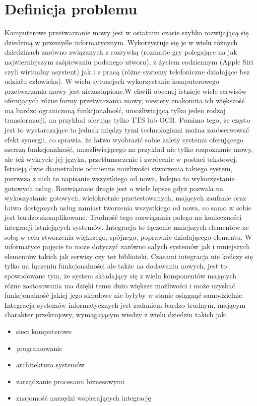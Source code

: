 \section{Definicja problemu} %
Komputerowe przetwarzanie mowy jest w ostatnim czasie szybko rozwijającą się dziedziną w przemyśle informatycznym. Wykorzystuje się je w wielu różnych dziedzinach zarówno związanych z rozrywką (rozmaite gry polegające na jak najwierniejszym zaśpiewaniu podanego utworu), z życiem codziennym (Apple Siri czyli wirtualny asystent) jak i z pracą (różne systemy telefoniczne działające bez udziału człowieka). W wielu sytuacjach wykorzystanie komputerowego przetwarzania mowy jest niezastąpione.W chwili obecnej istnieje wiele serwisów oferujących różne formy przetwarzania mowy, niestety znakomita ich większość ma bardzo ograniczoną funkcjonalność, umożliwiającą tylko jeden rodzaj transformacji, na przykład oferując tylko TTS lub OCR. Pomimo tego, że często jest to wystarczające to jednak między tymi technologiami można zaobserwować efekt synergii, co sprawia, że łatwo wyobrazić sobie zalety systemu oferującego szerszą funkcjonalność, umożliwiającego na przykład nie tylko rozpoznanie mowy, ale też wykrycie jej języka, przetłumaczenie i zwrócenie w postaci tekstowej. Istnieją dwie diametralnie odmienne możliwości stworzenia takiego system, pierwsza z nich to napisanie wszystkiego od nowa, kolejna to wykorzystanie gotowych usług. Rozwiązanie drugie jest o wiele lepsze gdyż pozwala na wykoszystanie gotowych, wielokrotnie przetestowanych, mających zaufanie oraz łatwo dostępnych usług zamiast tworzenia wszystkiego od nowa, co samo w sobie jest bardzo skomplikowane. Trudność tego rozwiązania polega na konieczności integracji istniejących systemów. Integracja to łączenie mniejszych elementów ze sobą w celu stworzenia większego, spójnego, poprawnie działającego elementu. W informatyce pojęcie to może dotyczyć zarówno całych systemów jak i mniejszych elementów takich jak serwisy czy też biblioteki. Czasami integracja nie kończy się tylko na łączeniu funkcjonalności ale także na dodawaniu nowych, jest to spowodowane tym, że system składający się z wielu komponentów mających różne zastosowania ma dzięki temu dużo większe możliwości i może uzyskać funkcjonalność jakiej jego składowe nie byłyby w stanie osiągnąć samodzielnie. Integracja systemów informatycznych jest zadaniem bardzo trudnym, mającym charakter przekrojowy, wymagającym wiedzy z wielu dziedzin takich jak:
 \begin{itemize}
	\item sieci komputerowe
	\item programowanie
	\item architektura systemów
	\item zarządzanie procesami biznesowymi
	\item znajomość narzędzi wspierających integrację
\end{itemize}   
